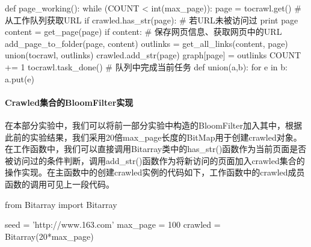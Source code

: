 \documentclass{article}
\begin{document}
\begin{python}
def page_working():
    while (COUNT < int(max_page)):
        page = tocrawl.get()        # 从工作队列获取URL
        if crawled.has_str(page):   # 若URL未被访问过
            print page
            content = get_page(page)
            if content:             # 保存网页信息、获取网页中的URL
                add_page_to_folder(page, content)
                outlinks = get_all_links(content, page)
                union(tocrawl, outlinks)
                crawled.add_str(page)
                graph[page] = outlinks
                COUNT += 1
        tocrawl.task_done()         # 队列中完成当前任务
def union(a,b):
    for e in b:
        a.put(e)
\end{python}

\paragraph{Crawled集合的BloomFilter实现}
在本部分实验中，我们可以将前一部分实验中构造的BloomFilter加入其中，根据此前的实验结果，我们采用20倍max\_page长度的BitMap用于创建crawled对象。在工作函数中，我们可以直接调用Bitarray类中的has\_str()函数作为当前页面是否被访问过的条件判断，调用add\_str()函数作为将新访问的页面加入crawled集合的操作实现。在主函数中的创建crawled实例的代码如下，工作函数中的crawled成员函数的调用可见上一段代码。

\begin{python}
from Bitarray import Bitarray

seed = 'http://www.163.com'
max_page = 100
crawled = Bitarray(20*max_page)
\end{python}
\end{document}
